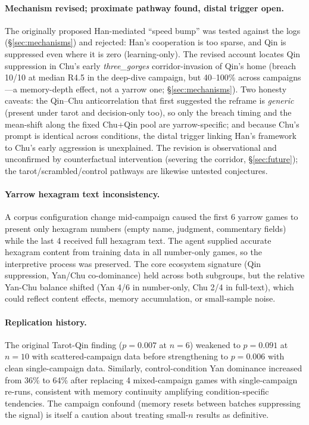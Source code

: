 \documentclass[11pt]{article}
\begin{document}
\paragraph{Mechanism revised; proximate pathway found, distal trigger open.} The originally proposed Han-mediated ``speed bump'' was tested against the logs (\S\ref{sec:mechanisms}) and rejected: Han's cooperation is too sparse, and Qin is suppressed even where it is zero (learning-only). The revised account locates Qin suppression in Chu's early \emph{three\_gorges} corridor-invasion of Qin's home (breach 10/10 at median R4.5 in the deep-dive campaign, but 40--100\% across campaigns---a memory-depth effect, not a yarrow one; \S\ref{sec:mechanisms}). Two honesty caveats: the Qin--Chu anticorrelation that first suggested the reframe is \emph{generic} (present under tarot and decision-only too), so only the breach timing and the mean-shift along the fixed Chu+Qin pool are yarrow-specific; and because Chu's prompt is identical across conditions, the distal trigger linking Han's framework to Chu's early aggression is unexplained. The revision is observational and unconfirmed by counterfactual intervention (severing the corridor, \S\ref{sec:future}); the tarot/scrambled/control pathways are likewise untested conjectures.

\paragraph{Yarrow hexagram text inconsistency.} A corpus configuration change mid-campaign caused the first 6 yarrow games to present only hexagram numbers (empty name, judgment, commentary fields) while the last 4 received full hexagram text. The agent supplied accurate hexagram content from training data in all number-only games, so the interpretive process was preserved. The core ecosystem signature (Qin suppression, Yan/Chu co-dominance) held across both subgroups, but the relative Yan-Chu balance shifted (Yan 4/6 in number-only, Chu 2/4 in full-text), which could reflect content effects, memory accumulation, or small-sample noise.

\paragraph{Replication history.} The original Tarot-Qin finding ($p = 0.007$ at $n = 6$) weakened to $p = 0.091$ at $n = 10$ with scattered-campaign data before strengthening to $p = 0.006$ with clean single-campaign data. Similarly, control-condition Yan dominance increased from 36\% to 64\% after replacing 4 mixed-campaign games with single-campaign re-runs, consistent with memory continuity amplifying condition-specific tendencies. The campaign confound (memory resets between batches suppressing the signal) is itself a caution about treating small-$n$ results as definitive.
\end{document}
